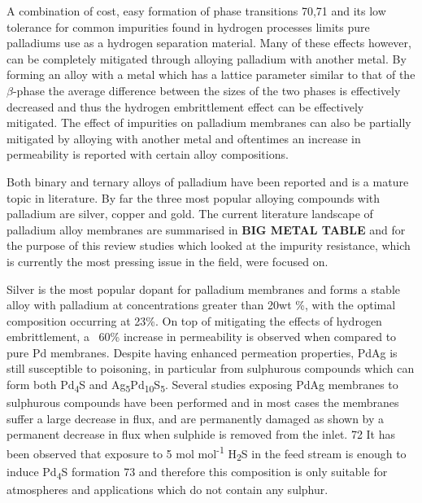 A combination of cost, easy formation of phase transitions 70,71 and its low tolerance for 
common impurities found in hydrogen processes limits pure palladiums use as a hydrogen 
separation material. Many of these effects however, can be completely mitigated through 
alloying palladium with another metal. By forming an alloy with a metal which has a lattice 
parameter similar to that of the $\beta$-phase the average difference between the sizes of 
the two phases is effectively decreased and thus the hydrogen embrittlement effect can be 
effectively mitigated. The effect of impurities on palladium membranes can also be partially 
mitigated by alloying with another metal and oftentimes an increase in permeability is 
reported with certain alloy compositions. 

Both binary and ternary alloys of palladium have been reported and is a mature topic in 
literature. By far the three most popular alloying compounds with palladium are silver, 
copper and gold. The current literature landscape of palladium alloy membranes are summarised 
in \textbf{BIG METAL TABLE} and for the purpose of this review studies which looked at the impurity resistance, which 
is currently the most pressing issue in the field, were focused on. 

Silver is the most popular dopant for palladium membranes and forms a stable alloy with 
palladium at concentrations greater than 20wt \%, with the optimal composition occurring at 
23\%. On top of mitigating the effects of hydrogen embrittlement, a ~60\% increase in 
permeability is observed when compared to pure Pd membranes. Despite having enhanced 
permeation properties, PdAg is still susceptible to poisoning, in particular from sulphurous 
compounds which can form both Pd\textsubscript{4}S and Ag\textsubscript{5}Pd\textsubscript{10}S\textsubscript{5}. Several studies exposing PdAg membranes 
to sulphurous compounds have been performed and in most cases the membranes suffer a large 
decrease in flux, and are permanently damaged as shown by a permanent decrease in flux when 
sulphide is removed from the inlet. 72 It has been observed that exposure to 5 \textmu mol mol\textsuperscript{-1} H\textsubscript{2}S 
in the feed stream is enough to induce Pd\textsubscript{4}S formation 73 and therefore this composition is 
only suitable for atmospheres and applications which do not contain any sulphur. 

